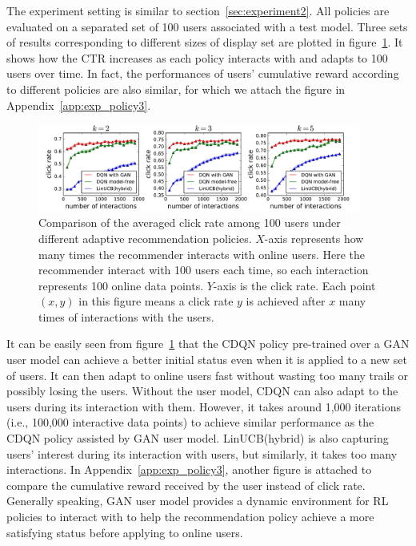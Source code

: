 \documentclass{article} %
\newcommand{\Li}[1]{{\color{cyan}{\bf\sf [Li: #1]}}}
\begin{document}
The experiment setting is similar to section~\ref{sec:experiment2}. All policies are evaluated on a separated set of 100 users associated with a test model. 
Three sets of results corresponding to different sizes of display set are plotted in figure~\ref{fg:experiment3}. It shows how the CTR increases as each policy interacts with and adapts to 100 users over time. In fact, the performances of users' cumulative reward according to different policies are also similar, for which we attach the figure in Appendix~\ref{app:exp_policy3}.

\begin{figure}[htbp]
\vspace{-4mm}
    \centering
    \includegraphics[width=0.95\textwidth]{Figs/policy_compare3_new.pdf}
    \vspace{-5mm}
\caption{\small Comparison of the averaged click rate among 100 users under different adaptive recommendation policies. $X$-axis represents how many times the recommender interacts with online users. Here the recommender interact with 100 users each time, so each interaction represents 100 online data points. $Y$-axis is the click rate. Each point $(x,y)$ in this figure means a click rate $y$ is achieved after $x$ many times of interactions with the users. \Li{suggest using different line type to make this figure more clear} }
\label{fg:experiment3}
\vspace{-3mm}
\end{figure}

It can be easily seen from figure~\ref{fg:experiment3} that the CDQN policy pre-trained over a GAN user model can achieve a better initial status even when it is applied to a new set of users. It can then adapt to online users fast without wasting too many trails or possibly losing the users. Without the user model, CDQN can also adapt to the users during its interaction with them. However, it takes around 1,000 iterations (i.e., 100,000 interactive data points) to achieve similar performance as the CDQN policy assisted by GAN user model. LinUCB(hybrid) is also capturing users' interest during its interaction with users, but similarly, it takes too many interactions. In Appendix~\ref{app:exp_policy3}, another figure is attached to compare the cumulative reward received by the user instead of click rate. Generally speaking, GAN user model provides a dynamic environment for RL policies to interact with to help the recommendation policy achieve a more satisfying status before applying to online users. 
\end{document}
